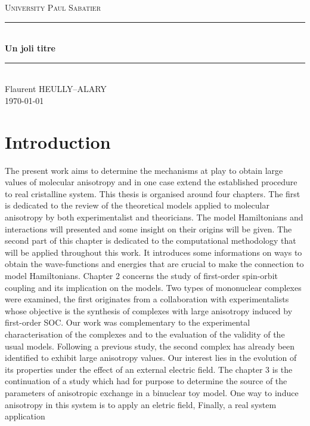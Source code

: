 \documentclass[12pt]{report}
\numberwithin{equation}{section}
\newcommand{\noun}[1]{\textsc{#1}}
\begin{document}

\begin{titlepage}
\newcommand{\HRule}{\rule{\linewidth}{0.5mm}}
\center
\textsc{\LARGE
University \noun{Paul Sabatier}
} \\[1cm]
\HRule\\[0.4cm]
{ \huge \bfseries Un joli titre \\[0.15cm] }
\HRule\\[1.5cm]
Flaurent HEULLY--ALARY
\\[1cm]
\today \\ [1cm]
\end{titlepage}
\begin{center}
\thispagestyle{plain}
\par\end{center}
\large
\tableofcontents
\newpage
\chapter{Introduction}

The present work aims to determine the mechanisms at play to obtain large values of molecular anisotropy and in one case extend the established procedure to real cristalline system.
This thesis is organised around four chapters. The first is dedicated to the review of the theoretical models applied to molecular anisotropy by both experimentalist and theoricians.
The model Hamiltonians and interactions will presented and some insight on their origins will be given.
The second part of this chapter is dedicated to the computational methodology that will be applied throughout this work.
It introduces some informations on ways to obtain the wave-functions and energies that are crucial to make the connection to model Hamiltonians.
Chapter 2 concerns the study of first-order spin-orbit coupling and its implication on the models. 
Two types of mononuclear complexes were examined, the first originates from a collaboration with experimentalists whose objective is the synthesis of complexes with large anisotropy induced by first-order SOC.
Our work was complementary to the experimental characterisation of the complexes and to the evaluation of the validity of the usual models.
Following a previous study, the second complex has already been identified to exhibit large anisotropy values.
Our interest lies in the evolution of its properties under the effect of an external electric field.
The chapter 3 is the continuation of a study which had for purpose to determine the source of the parameters of anisotropic exchange in a binuclear toy model.
One way to induce anisotropy in this system is to apply an eletric field,
Finally, a real system application 
\end{document}
